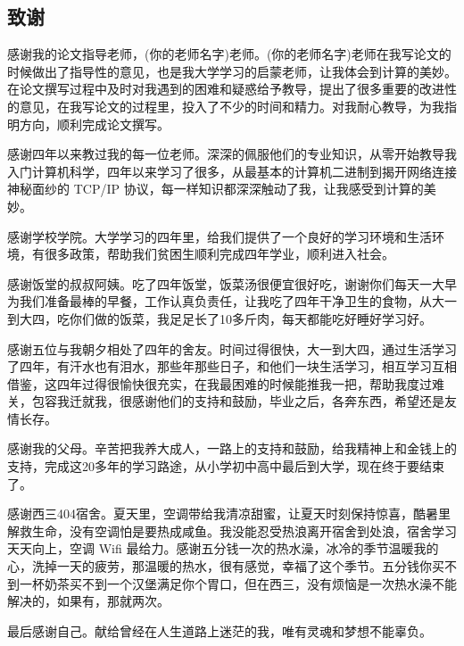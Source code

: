\begin{spacing}{1.5}
\section*{致谢}

感谢我的论文指导老师，(你的老师名字)老师。(你的老师名字)老师在我写论文的时候做出了指导性的意见，也是我大学学习的启蒙老师，让我体会到计算的美妙。在论文撰写过程中及时对我遇到的困难和疑惑给予教导，提出了很多重要的改进性的意见，在我写论文的过程里，投入了不少的时间和精力。对我耐心教导，为我指明方向，顺利完成论文撰写。

感谢四年以来教过我的每一位老师。深深的佩服他们的专业知识，从零开始教导我入门计算机科学，四年以来学习了很多，从最基本的计算机二进制到揭开网络连接神秘面纱的 TCP/IP 协议，每一样知识都深深触动了我，让我感受到计算的美妙。

感谢学校学院。大学学习的四年里，给我们提供了一个良好的学习环境和生活环境，有很多政策，帮助我们贫困生顺利完成四年学业，顺利进入社会。

感谢饭堂的叔叔阿姨。吃了四年饭堂，饭菜汤很便宜很好吃，谢谢你们每天一大早为我们准备最棒的早餐，工作认真负责任，让我吃了四年干净卫生的食物，从大一到大四，吃你们做的饭菜，我足足长了10多斤肉，每天都能吃好睡好学习好。

感谢五位与我朝夕相处了四年的舍友。时间过得很快，大一到大四，通过生活学习了四年，有汗水也有泪水，那些年那些日子，和他们一块生活学习，相互学习互相借鉴，这四年过得很愉快很充实，在我最困难的时候能推我一把，帮助我度过难关，包容我迁就我，很感谢他们的支持和鼓励，毕业之后，各奔东西，希望还是友情长存。

感谢我的父母。辛苦把我养大成人，一路上的支持和鼓励，给我精神上和金钱上的支持，完成这20多年的学习路途，从小学初中高中最后到大学，现在终于要结束了。

感谢西三404宿舍。夏天里，空调带给我清凉甜蜜，让夏天时刻保持惊喜，酷暑里解救生命，没有空调怕是要热成咸鱼。我没能忍受热浪离开宿舍到处浪，宿舍学习天天向上，空调 Wifi 最给力。感谢五分钱一次的热水澡，冰冷的季节温暖我的心，洗掉一天的疲劳，那温暖的热水，很有感觉，幸福了这个季节。五分钱你买不到一杯奶茶买不到一个汉堡满足你个胃口，但在西三，没有烦恼是一次热水澡不能解决的，如果有，那就两次。

\newpage

最后感谢自己。献给曾经在人生道路上迷茫的我，唯有灵魂和梦想不能辜负。

\end{spacing}